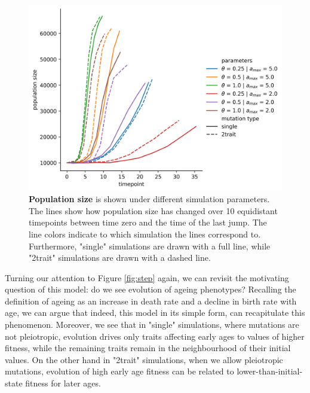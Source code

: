 \documentclass[11pt, a4paper]{article}
\theoremstyle{definition}
\begin{document}
    \begin{figure}[!htb]
        \center
        \includegraphics[scale=0.6]{figures/population_size.png}
        \caption{\textbf{Population size} is shown under different simulation parameters. The lines show how population size has changed over 10 equidistant timepoints between time zero and the time of the last jump. The line colors indicate to which simulation the lines correspond to. Furthermore, "single" simulations are drawn with a full line, while "2trait" simulations are drawn with a dashed line.}
        \label{fig:popsize}
    \end{figure}

    Turning our attention to Figure \ref{fig:step} again, we can revisit the motivating question of this model: do we see evolution of ageing phenotypes? Recalling the definition of ageing as an increase in death rate and a decline in birth rate with age, we can argue that indeed, this model in its simple form, can recapitulate this phenomenon. Moreover, we see that in "single" simulations, where mutations are not pleiotropic, evolution drives only traits affecting early ages to
    values of higher fitness, while the remaining traits remain in the neighbourhood of their initial values. On the other hand in "2trait" simulations, when we allow pleiotropic mutations, evolution of high early age fitness can be related to lower-than-initial-state fitness for later ages. 

    
\end{document}
